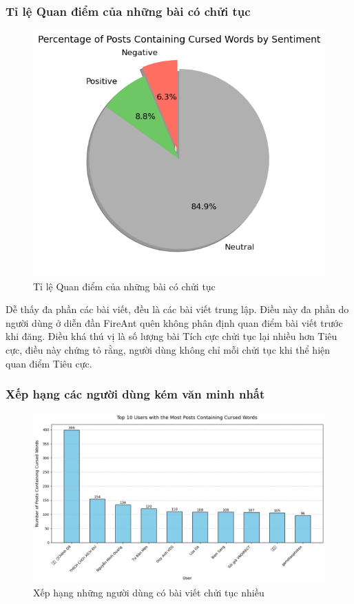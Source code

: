 \subsubsection{Tỉ lệ Quan điểm của những bài có chửi tục}
\begin{figure}[H]
    \centering
    \includegraphics[width=0.55\linewidth]{images/C2_pic41.png}
    \vspace{-1em}
      \caption{Tỉ lệ Quan điểm của những bài có chửi tục}
      \label{fig:2.24}
\end{figure}
Dễ thấy đa phần các bài viết, đều là các bài viết trung lập. Điều này đa phần do người dùng ở diễn đần FireAnt quên không phân định quan điểm bài viết trước khi đăng. Điều khá thú vị là số lượng bài Tích cực chửi tục lại nhiều hơn Tiêu cực, điều này chứng tỏ rằng, người dùng không chỉ mỗi chửi tục khi thể hiện quan điểm Tiêu cực.

\subsubsection{Xếp hạng các người dùng kém văn minh nhất}

\begin{figure}[H]
    \centering
    \includegraphics[width=0.85\linewidth]{images/C2_pic35.png}
    \caption{Xếp hạng những người dùng có bài viết chửi tục nhiều}
    \label{fig:2.25}
\end{figure}

